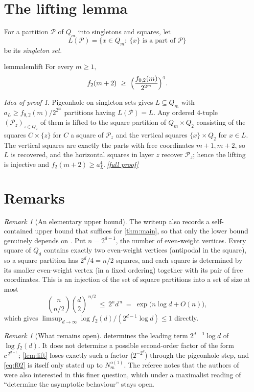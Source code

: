 \documentclass[11pt,a4paper]{article}
\theoremstyle{plain}
\theoremstyle{definition}
\theoremstyle{remark}
\newtheorem{remark}[theorem]{Remark}
\newtheorem*{proofidea}{Idea of proof}
\newcommand{\fullproofref}[1]{\,\hyperref[#1]{\textit{[full proof]}}}
\newcommand{\cP}{\mathcal P}
\begin{document}
\section{The lifting lemma}

For a partition $\cP$ of $Q_m$ into singletons and squares, let
\[
 L(\cP)=\{x\in Q_m:\ \{x\}\text{ is a part of }\cP\}
\]
be its \emph{singleton set}.

\begin{restatable}{lemma}{lemlift}\label{lem:lift}
For every $m\ge1$,
\[
 f_2(m+2)\ \ge\ \Bigl(\frac{f_{0,2}(m)}{2^{2^m}}\Bigr)^{4}.
\]
\end{restatable}

\begin{proofidea}
Pigeonhole on singleton sets gives $L\subseteq Q_m$ with $a_L\ge f_{0,2}(m)/2^{2^m}$ partitions having $L(\cP)=L$. Any ordered $4$-tuple $(\cP_z)_{z\in Q_2}$ of them is lifted to the square partition of $Q_m\times Q_2$ consisting of the squares $C\times\{z\}$ for $C$ a square of $\cP_z$ and the vertical squares $\{x\}\times Q_2$ for $x\in L$. The vertical squares are exactly the parts with free coordinates $m+1,m+2$, so $L$ is recovered, and the horizontal squares in layer $z$ recover $\cP_z$; hence the lifting is injective and $f_2(m+2)\ge a_L^4$.\fullproofref{pf:lift}
\end{proofidea}

\section{Remarks}

\begin{remark}[An elementary upper bound]\label{rem:elementary}
The writeup also records a self-contained upper bound that suffices for \cref{thm:main}, so that only the lower bound genuinely depends on \cite{ABP}. Put $n=2^{d-1}$, the number of even-weight vertices. Every square of $Q_d$ contains exactly two even-weight vertices (antipodal in the square), so a square partition has $2^d/4=n/2$ squares, and each square is determined by its smaller even-weight vertex (in a fixed ordering) together with its pair of free coordinates. This is an injection of the set of square partitions into a set of size at most
\[
 \binom{n}{n/2}\binom d2^{\,n/2}\ \le\ 2^n d^{\,n}\ =\ \exp\bigl(n\log d+O(n)\bigr),
\]
which gives $\limsup_{d\to\infty}\log f_2(d)/(2^{d-1}\log d)\le1$ directly.
\end{remark}

\begin{remark}[What remains open]\label{rem:open}
 determines the leading term $2^{d-1}\log d$ of $\log f_2(d)$. It does not determine a possible second-order factor of the form $c^{\,2^{d-1}}$; \cref{lem:lift} loses exactly such a factor ($2^{-2^{d}}$) through the pigeonhole step, and \eqref{eq:f02} is itself only stated up to $N_m^{o(1)}$. The referee notes that the authors of \cite{ABP} were also interested in this finer question, which under a maximalist reading of ``determine the asymptotic behaviour'' stays open.
\end{remark}
\end{document}
